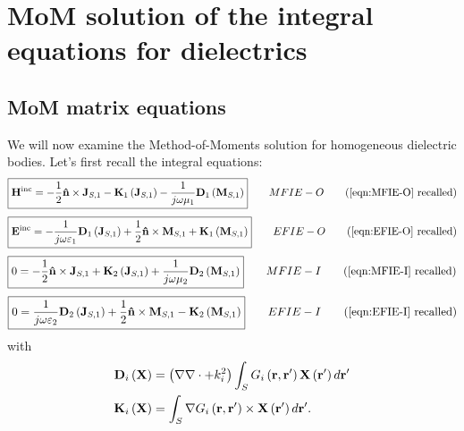 \chapter{MoM solution of the integral equations for dielectrics}

\section{MoM matrix equations}
%
\par
We will now examine the Method-of-Moments solution for homogeneous dielectric bodies. Let's first recall the integral equations:
\begin{equation*}
\boxed{
\field{H}^\text{inc} = - \frac{1}{2} \vect{\hat{n}} \times \current{J}_{S,1} - \operator{K}_1 \left(\current{J}_{S,1}\right) - \frac{1}{j \omega \mu_1} \operator{D}_1 \left( \current{M}_{S,1}\right) 
} \qquad MFIE-O \tag{\ref{eqn:MFIE-O} recalled}
\end{equation*}
\begin{equation*}
\boxed{
\field{E}^\text{inc} =   - \frac{1}{j \omega \varepsilon_1} \operator{D}_1 \left( \current{J}_{S,1}\right) + \frac{1}{2} \vect{\hat{n}} \times \current{M}_{S,1} + \operator{K}_1 \left(\current{M}_{S,1}\right)
} \qquad EFIE-O \tag{\ref{eqn:EFIE-O} recalled}
\end{equation*}
\begin{equation*}
\boxed{
0 = - \frac{1}{2} \vect{\hat{n}} \times \current{J}_{S,1} + \operator{K}_2\left( \current{J}_{S,1}\right) + \frac{1}{j \omega \mu_2} \operator{D}_2\left(\current{M}_{S,1}\right)
} \qquad MFIE-I \tag{\ref{eqn:MFIE-I} recalled}
\end{equation*}
\begin{equation*}
\boxed{
0 = \frac{1}{j \omega \varepsilon_2} \operator{D}_2\left(\current{J}_{S,1}\right) + \frac{1}{2} \vect{\hat{n}} \times \current{M}_{S,1} -  \operator{K}_2\left( \current{M}_{S,1}\right)
} \qquad EFIE-I \tag{\ref{eqn:EFIE-I} recalled}
\end{equation*}
with
\begin{align*}
\mathbf{D}_i\left(\mathbf{X}\right) &= \left(\nabla \nabla \cdot + k_i^2\right) \int_{S} G_i\left(\mathbf{r}, \mathbf{r}'\right) \mathbf{X}\left(\mathbf{r}'\right) d\mathbf{r}' \\
\mathbf{K}_i\left(\mathbf{X}\right) &= \int_S \nabla G_i\left(\mathbf{r}, \mathbf{r}'\right) \times \mathbf{X}\left(\mathbf{r}'\right) d\mathbf{r}'.
\end{align*}
%
\par
